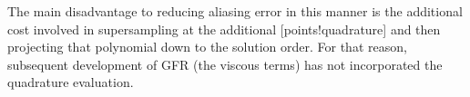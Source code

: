 
The main disadvantage to reducing aliasing error in this manner is
the additional cost involved in supersampling at the additional
[points!quadrature] and then projecting that
polynomial down to the solution order.
%
For that reason, subsequent development of GFR (\thatis the viscous terms)
has not incorporated the quadrature evaluation.


